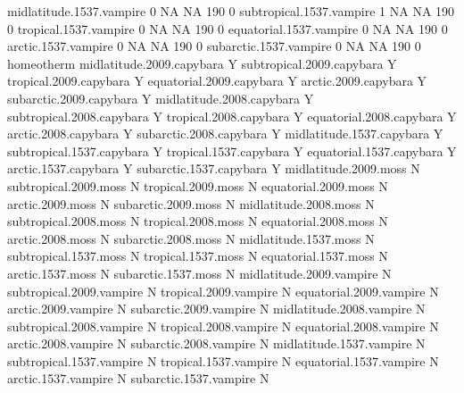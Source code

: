 \documentclass{article}
\numberwithin{exercise}{section}
\begin{document}
\begin{Schunk}
\begin{Soutput}
midlatitude.1537.vampire          0          NA            NA       190              0
subtropical.1537.vampire          1          NA            NA       190              0
tropical.1537.vampire             0          NA            NA       190              0
equatorial.1537.vampire           0          NA            NA       190              0
arctic.1537.vampire               0          NA            NA       190              0
subarctic.1537.vampire            0          NA            NA       190              0
                          homeotherm
midlatitude.2009.capybara          Y
subtropical.2009.capybara          Y
tropical.2009.capybara             Y
equatorial.2009.capybara           Y
arctic.2009.capybara               Y
subarctic.2009.capybara            Y
midlatitude.2008.capybara          Y
subtropical.2008.capybara          Y
tropical.2008.capybara             Y
equatorial.2008.capybara           Y
arctic.2008.capybara               Y
subarctic.2008.capybara            Y
midlatitude.1537.capybara          Y
subtropical.1537.capybara          Y
tropical.1537.capybara             Y
equatorial.1537.capybara           Y
arctic.1537.capybara               Y
subarctic.1537.capybara            Y
midlatitude.2009.moss              N
subtropical.2009.moss              N
tropical.2009.moss                 N
equatorial.2009.moss               N
arctic.2009.moss                   N
subarctic.2009.moss                N
midlatitude.2008.moss              N
subtropical.2008.moss              N
tropical.2008.moss                 N
equatorial.2008.moss               N
arctic.2008.moss                   N
subarctic.2008.moss                N
midlatitude.1537.moss              N
subtropical.1537.moss              N
tropical.1537.moss                 N
equatorial.1537.moss               N
arctic.1537.moss                   N
subarctic.1537.moss                N
midlatitude.2009.vampire           N
subtropical.2009.vampire           N
tropical.2009.vampire              N
equatorial.2009.vampire            N
arctic.2009.vampire                N
subarctic.2009.vampire             N
midlatitude.2008.vampire           N
subtropical.2008.vampire           N
tropical.2008.vampire              N
equatorial.2008.vampire            N
arctic.2008.vampire                N
subarctic.2008.vampire             N
midlatitude.1537.vampire           N
subtropical.1537.vampire           N
tropical.1537.vampire              N
equatorial.1537.vampire            N
arctic.1537.vampire                N
subarctic.1537.vampire             N
\end{Soutput}
\end{Schunk}
\end{document}
